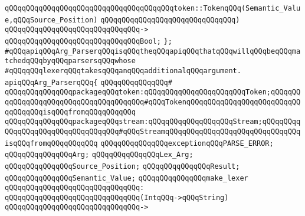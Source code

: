 \verb|qQQqqQQqqQQqqQQqqQQqqQQqqQQqqQQqqQQqqQQqtoken::TokenqQQq(Semantic_Value,qQQqSource_Position)|\newline
\verb|qQQqqQQqqQQqqQQqqQQqqQQqqQQqqQQq)|\newline
\verb|qQQqqQQqqQQqqQQqqQQqqQQqqQQqqQQq->|\newline
\verb|qQQqqQQqqQQqqQQqqQQqqQQqqQQqqQQqBool;|\newline
\verb|};|\newline
\newline
\verb|#qQQqapiqQQqArg_ParserqQQqisqQQqtheqQQqapiqQQqthatqQQqwillqQQqbeqQQqmatchedqQQqbyqQQqparsersqQQqwhose|\newline
\verb|#qQQqqQQqlexerqQQqtakesqQQqanqQQqadditionalqQQqargument.|\newline
\newline
\verb|apiqQQqArg_ParserqQQq{|\newline
\verb|qQQqqQQqqQQqqQQq#|\newline
\verb|qQQqqQQqqQQqqQQqpackageqQQqtoken:qQQqqQQqqQQqqQQqqQQqqQQqToken;qQQqqQQqqQQqqQQqqQQqqQQqqQQqqQQqqQQqqQQq#qQQqTokenqQQqqQQqqQQqqQQqqQQqqQQqqQQqqQQqqQQqisqQQqfromqQQqqQQqqQQq|\newline
\verb|qQQqqQQqqQQqqQQqpackageqQQqstream:qQQqqQQqqQQqqQQqqQQqStream;qQQqqQQqqQQqqQQqqQQqqQQqqQQqqQQqqQQq#qQQqStreamqQQqqQQqqQQqqQQqqQQqqQQqqQQqqQQqisqQQqfromqQQqqQQqqQQq|\newline
\newline
\verb|qQQqqQQqqQQqqQQqexceptionqQQqPARSE_ERROR;|\newline
\newline
\verb|qQQqqQQqqQQqqQQqArg;|\newline
\verb|qQQqqQQqqQQqqQQqLex_Arg;|\newline
\verb|qQQqqQQqqQQqqQQqSource_Position;|\newline
\verb|qQQqqQQqqQQqqQQqResult;|\newline
\verb|qQQqqQQqqQQqqQQqSemantic_Value;|\newline
\newline
\verb|qQQqqQQqqQQqqQQqmake_lexer|\newline
\verb|qQQqqQQqqQQqqQQqqQQqqQQqqQQqqQQq:|\newline
\verb|qQQqqQQqqQQqqQQqqQQqqQQqqQQqqQQq(IntqQQq->qQQqString)|\newline
\verb|qQQqqQQqqQQqqQQqqQQqqQQqqQQqqQQq->|\newline
